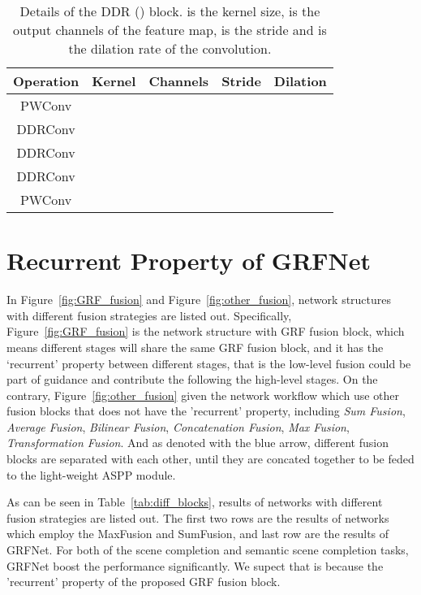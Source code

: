 \documentclass[10pt,twocolumn,letterpaper]{article}
\begin{document}
\begin{table}[htbp]
\begin{center}
\scalebox{0.99}
{
\begin{tabular}{c|c|c|c|c}
\hline
Operation & Kernel              & Channels & Stride & Dilation \\ \hline
PWConv    &  &       &       &         \\
DDRConv   &  &       &     &       \\
DDRConv   &  &       &     &       \\
DDRConv   &  &       &     &       \\
PWConv    &  &         &       &         \\ \hline
\end{tabular}

}
\end{center}
\caption{Details of the DDR () block.  is the kernel size,  is the output channels of the feature map,  is the stride and  is the dilation rate of the convolution.}
\label{tab:ConvInDdr3d}
\end{table}

\section{Recurrent Property of GRFNet}
In Figure~\ref{fig:GRF_fusion} and Figure~\ref{fig:other_fusion}, network structures with different fusion strategies are listed out. Specifically, Figure~\ref{fig:GRF_fusion} is the network structure with GRF fusion block, which means different stages will share the same GRF fusion block, and it has the `recurrent' property between different stages, that is the low-level fusion could be part of guidance and contribute the following the high-level stages. On the contrary, Figure~\ref{fig:other_fusion} given the network workflow which use other fusion blocks that does not have the 'recurrent' property, including
\textit{Sum Fusion}, \textit{Average Fusion}, \textit{Bilinear Fusion}, \textit{Concatenation Fusion}, \textit{Max Fusion}, \textit{Transformation Fusion}. And as denoted with the blue arrow, different fusion blocks are separated with each other, until they are concated together to be feded to the light-weight ASPP module.

As can be seen in Table~\ref{tab:diff_blocks}, results of networks with different fusion strategies are listed out. The first two rows are the results of networks which employ the MaxFusion and SumFusion, and last row are the results of GRFNet. For both of the scene completion and semantic scene completion tasks, GRFNet boost the performance significantly. We supect that is because the 'recurrent' property of the proposed GRF fusion block.
\end{document}
